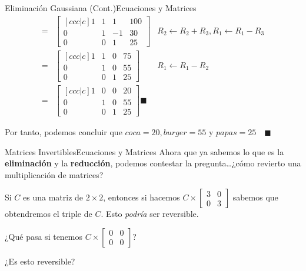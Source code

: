 \documentclass[spanish, c]{beamer}
\begin{document}
\begin{frame}{Eliminación Gaussiana (Cont.)}{Ecuaciones y Matrices}
    \begin{align*}
        = & \begin{bmatrix}[ccc|c]
            1 & 1 & 1 & 100 \\
            0 & 1 & -1 & 30 \\
            0 & 0 & 1 & 25
        \end{bmatrix}
        & R_2 \gets R_2 + R_3, R_1 \gets R_1 - R_3 \\
        = & \begin{bmatrix}[ccc|c]
            1 & 1 & 0 & 75 \\
            0 & 1 & 0 & 55 \\
            0 & 0 & 1 & 25
        \end{bmatrix}
        & R_1 \gets R_1 - R_2 \\
        = & \begin{bmatrix}[ccc|c]
            1 & 0 & 0 & 20 \\
            0 & 1 & 0 & 55 \\
            0 & 0 & 1 & 25
        \end{bmatrix} \blacksquare
    \end{align*}

    Por tanto, podemos concluir que $coca = 20, burger = 55$ y $papas = 25 \quad \blacksquare$

\end{frame}

\begin{frame}{Matrices Invertibles}{Ecuaciones y Matrices}
    Ahora que ya sabemos lo que es la \textbf{eliminación} y la \textbf{reducción}, podemos contestar la pregunta\dots ¿cómo revierto una multiplicación de matrices? \pause

    \bigskip

    Si $C$ es una matriz de $2 \times  2$, entonces si hacemos $C \times \begin{bmatrix*}
        3 & 0 \\ 0 & 3
    \end{bmatrix*}$ sabemos que obtendremos el triple de $C$. Esto \textit{podría} ser reversible. \pause

    \bigskip

    ¿Qué pasa si tenemos $C \times \begin{bmatrix*}
        0 & 0 \\ 0 & 0
    \end{bmatrix*}$? \pause

    \bigskip

    ¿Es esto reversible?

\end{frame}
\end{document}
